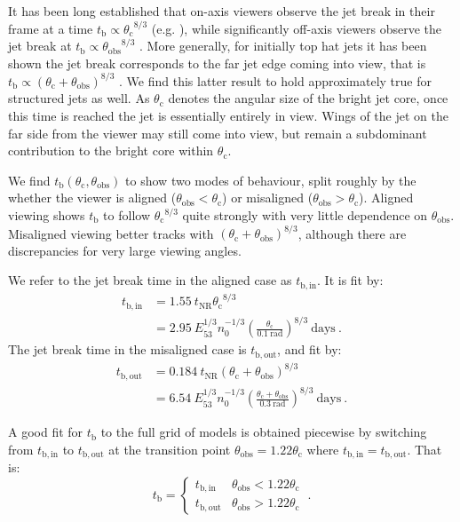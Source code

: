 \documentclass[twocolumn]{aastex62}
\newcommand{\tNR}{\ensuremath{t_{\mathrm{NR}}}}
\newcommand{\tb}{\ensuremath{t_{\mathrm{b}}}}
\newcommand{\tbin}{\ensuremath{t_{\mathrm{b, in}}}}
\newcommand{\tbout}{\ensuremath{t_{\mathrm{b, out}}}}
\newcommand{\thobs}{\ensuremath{\theta_{\mathrm{obs}}}}
\newcommand{\thC}{\ensuremath{\theta_{\mathrm{c}}}}
\begin{document}
It has been long established that on-axis viewers observe the jet break in their frame at a time $\tb \propto \thC^{8/3}$ (e.g. \citet{Rhoads:1999aa}), while significantly off-axis viewers observe the jet break at $\tb \propto \thobs^{8/3}$ \citep{Rossi:2002aa, Panaitescu:2003aa}.  More generally, for initially top hat jets it has been shown the jet break corresponds to the far jet edge coming into view, that is $\tb \propto (\thC + \thobs)^{8/3}$ \citep{van-Eerten:2010aa}.  We find this latter result to hold approximately true for structured jets as well.  As $\thC$ denotes the angular size of the bright jet core, once this time is reached the jet is essentially entirely in view.  Wings of the jet on the far side from the viewer may still come into view, but remain a subdominant contribution to the bright core within $\thC$.  

We find $\tb(\thC, \thobs)$ to show two modes of behaviour, split roughly by the whether the viewer is aligned ($\thobs < \thC$) or misaligned ($\thobs > \thC$).  Aligned viewing shows $\tb$ to follow $\thC^{8/3}$ quite strongly with very little dependence on $\thobs$.  Misaligned viewing better tracks with $(\thC + \thobs)^{8/3}$, although there are discrepancies for very large viewing angles.

We refer to the jet break time in the aligned case as $\tbin$.  It is fit by:
\begin{align}
	\tbin &= 1.55\ \tNR \thC^{8/3} \label{eq:tbin}\\
		&= 2.95\ E_{53}^{1/3} n_0^{-1/3} \left(\frac{\thC}{0.1\ \mathrm{rad}}\right)^{8/3}\ \mathrm{days}\ . \nonumber 
\end{align}
The jet break time in the misaligned case is $\tbout$, and fit by:
\begin{align}
	\tbout &= 0.184\ \tNR (\thC+\thobs)^{8/3} \label{eq:tbout} \\
		&= 6.54\ E_{53}^{1/3} n_0^{-1/3} \left(\frac{\thC+\thobs}{0.3\ \mathrm{rad}}\right)^{8/3}\ \mathrm{days}\ . \nonumber 			
\end{align}

A good fit for $\tb$ to the full grid of models is obtained piecewise by switching from $\tbin$ to $\tbout$ at the transition point $\thobs = 1.22 \thC$ where $\tbin = \tbout$.  That is:
\begin{equation}
	\tb = \begin{cases}
			\tbin & \thobs < 1.22 \thC \\
			\tbout & \thobs > 1.22 \thC
		\end{cases} \ . \label{eq:tb}
\end{equation}
\end{document}
